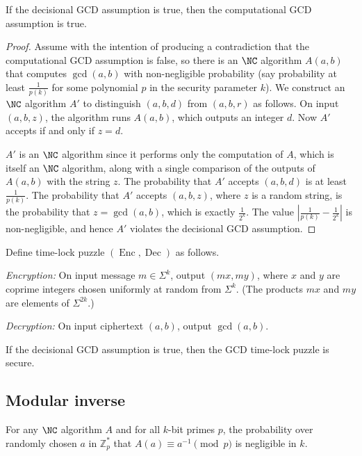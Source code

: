 \documentclass{article}
\newcommand{\Enc}{\operatorname{Enc}}
\newcommand{\Dec}{\operatorname{Dec}}
\newcommand{\Zp}{\mathbb{Z}^*_p}
\begin{document}
\begin{proposition}
  If the decisional GCD assumption is true, then the computational GCD assumption is true.
\end{proposition}
\begin{proof}
  Assume with the intention of producing a contradiction that the computational GCD assumption is false, so there is an $\NC$ algorithm $A(a, b)$ that computes $\gcd(a, b)$ with non-negligible probability (say probability at least $\frac{1}{p(k)}$ for some polynomial $p$ in the security parameter $k$).
  We construct an $\NC$ algorithm $A'$ to distinguish $(a, b, d)$ from $(a, b, r)$ as follows.
  On input $(a, b, z)$, the algorithm runs $A(a, b)$, which outputs an integer $d$.
  Now $A'$ accepts if and only if $z = d$.

  $A'$ is an $\NC$ algorithm since it performs only the computation of $A$, which is itself an $\NC$ algorithm, along with a single comparison of the outputs of $A(a, b)$ with the string $z$.
  The probability that $A'$ accepts $(a, b, d)$ is at least $\frac{1}{p(k)}$.
  The probability that $A'$ accepts $(a, b, z)$, where $z$ is a random string, is the probability that $z = \gcd(a, b)$, which is exactly $\frac{1}{2^k}$.
  The value $\left|\frac{1}{p(k)} - \frac{1}{2^k}\right|$ is non-negligible, and hence $A'$ violates the decisional GCD assumption.
\end{proof}

\begin{protocol}
  Define time-lock puzzle $(\Enc, \Dec)$ as follows.

  \emph{Encryption:} On input message $m \in \Sigma^k$, output $(mx, my)$, where $x$ and $y$ are coprime integers chosen uniformly at random from $\Sigma^k$. (The products $mx$ and $my$ are elements of $\Sigma^{2k}$.)

  \emph{Decryption:} On input ciphertext $(a, b)$, output $\gcd(a, b)$.
\end{protocol}

\begin{conjecture}
  If the decisional GCD assumption is true, then the GCD time-lock puzzle is secure.
\end{conjecture}

\subsection{Modular inverse}

\begin{assumption}
  For any $\NC$ algorithm $A$ and for all $k$-bit primes $p$, the probability over randomly chosen $a$ in $\Zp$ that $A(a) \equiv a^{-1} \pmod{p}$ is negligible in $k$.
\end{assumption}
\end{document}
